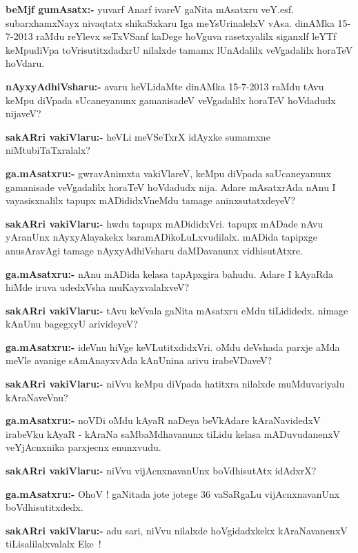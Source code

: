 \smallskip
\noindent
\textbf{beMjf gumAsatx:-} yuvarf Anarf ivareV gaNita mAsatxru veY.esf. subarxhamxNayx nivaqtatx shikaSxkaru Iga meYsUrinalelxV vAsa. dinAMka {\rm 15-7-2013} raMdu reYlevx seTxVSanf kaDege hoVguva rasetxyalilx siganxlf leYTf keMpudiVpa toVrisutitxdadxrU nilalxde tamamx lUnAdalilx veVgadalilx horaTeV hoVdaru.

\smallskip
\smallskip
\noindent
\textbf{nAyxyAdhiVsharu:-} avaru heVLidaMte dinAMka {\rm 15-7-2013} raMdu tAvu keMpu diVpada sUcaneyanunx gamanisadeV veVgadalilx horaTeV hoVdadudx nijaveV?

\smallskip
\noindent
\textbf{sakARri vakiVlaru:-} heVLi meVSeTxrX idAyxke sumamxne niMtubiTaTxralalx?

\smallskip
\noindent
\textbf{ga.mAsatxru:-} gwravAnimxta vakiVlareV, keMpu diVpada saUcaneyanunx gamanisade veVgadalilx horaTeV hoVdadudx nija. Adare mAsatxrAda nAnu I vayasisxnalilx tapupx mADididxVneMdu tamage aninxsutatxdeyeV?

\smallskip
\noindent
\textbf{sakARri vakiVlaru:-} hwdu tapupx mADididxVri. tapupx mADade nAvu yAranUnx nAyxyAlayakekx baramADikoLuLxvudilalx. mADida tapipxge anusAravAgi tamage nAyxyAdhiVsharu daMDavanunx vidhisutAtxre.

\smallskip
\noindent
\textbf{ga.mAsatxru:-} nAnu mADida kelasa tapApxgira bahudu. Adare I kAyaRda hiMde iruva udedxVsha muKayxvalalxveV?

\smallskip
\noindent
\textbf{sakARri vakiVlaru:-} tAvu keVvala gaNita mAsatxru eMdu tiLididedx. nimage kAnUnu bagegxyU arivideyeV?

\smallskip
\noindent
\textbf{ga.mAsatxru:-} ideVnu hiVge keVLutitxdidxVri. oMdu deVshada parxje aMda meVle avanige sAmAnayxvAda kAnUnina arivu irabeVDaveV?

\smallskip
\noindent
\textbf{sakARri vakiVlaru:-} niVvu keMpu diVpada hatitxra nilalxde muMduvariyalu kAraNaveVnu?

\smallskip
\noindent
\textbf{ga.mAsatxru:-} noVDi oMdu kAyaR naDeya beVkAdare kAraNavidedxV irabeVku kAyaR - kAraNa saMbaMdhavanunx tiLidu kelasa mADuvudanenxV veYjAcnxnika parxjecnx enunxvudu.

\smallskip
\noindent
\textbf{sakARri vakiVlaru:-} niVvu vijAcnxnavanUnx boVdhisutAtx idAdxrX?

\smallskip
\noindent
\textbf{ga.mAsatxru:-} OhoV ! gaNitada jote jotege {\rm 36} vaSaRgaLu vijAcnxnavanUnx boVdhisutitxdedx.

\smallskip
\noindent
\textbf{sakARri vakiVlaru:-} adu sari, niVvu nilalxde hoVgidadxkekx kAraNavanenxV tiLisalilalxvalalx Eke~!

